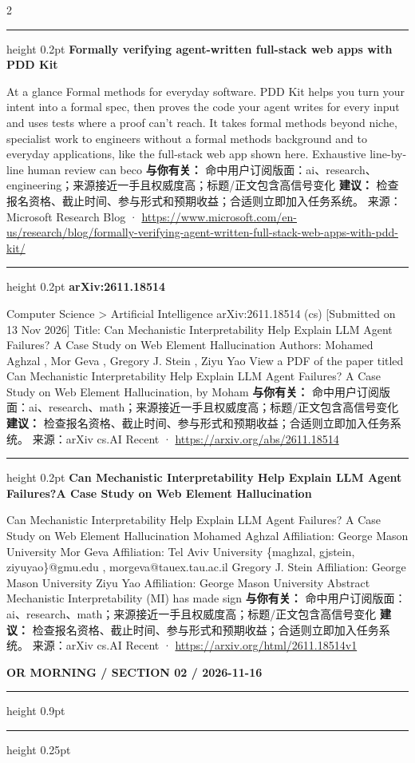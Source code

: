 \documentclass[10.5pt]{ctexart}
\begin{document}
\begin{multicols}{2}
\vspace{2mm}
\hrule height 0.2pt
\vspace{2mm}
{\large\bfseries Formally verifying agent-written full-stack web apps with PDD Kit}\par
At a glance Formal methods for everyday software. PDD Kit helps you turn your intent into a formal spec, then proves the code your agent writes for every input and uses tests where a proof can’t reach. It takes formal methods beyond niche, specialist work to engineers without a formal methods background and to everyday applications, like the full-stack web app shown here. Exhaustive line-by-line human review can beco
\textbf{与你有关：} 命中用户订阅版面：ai、research、engineering；来源接近一手且权威度高；标题/正文包含高信号变化
\textbf{建议：} 检查报名资格、截止时间、参与形式和预期收益；合适则立即加入任务系统。
{\footnotesize\color{ormuted} 来源：Microsoft Research Blog · \url{https://www.microsoft.com/en-us/research/blog/formally-verifying-agent-written-full-stack-web-apps-with-pdd-kit/}}
\vspace{2mm}
\hrule height 0.2pt
\vspace{2mm}
{\large\bfseries arXiv:2611.18514}\par
Computer Science > Artificial Intelligence arXiv:2611.18514 (cs) [Submitted on 13 Nov 2026] Title: Can Mechanistic Interpretability Help Explain LLM Agent Failures? A Case Study on Web Element Hallucination Authors: Mohamed Aghzal , Mor Geva , Gregory J. Stein , Ziyu Yao View a PDF of the paper titled Can Mechanistic Interpretability Help Explain LLM Agent Failures? A Case Study on Web Element Hallucination, by Moham
\textbf{与你有关：} 命中用户订阅版面：ai、research、math；来源接近一手且权威度高；标题/正文包含高信号变化
\textbf{建议：} 检查报名资格、截止时间、参与形式和预期收益；合适则立即加入任务系统。
{\footnotesize\color{ormuted} 来源：arXiv cs.AI Recent · \url{https://arxiv.org/abs/2611.18514}}
\vspace{2mm}
\hrule height 0.2pt
\vspace{2mm}
{\large\bfseries Can Mechanistic Interpretability Help Explain LLM Agent Failures?A Case Study on Web Element Hallucination}\par
Can Mechanistic Interpretability Help Explain LLM Agent Failures? A Case Study on Web Element Hallucination Mohamed Aghzal Affiliation: George Mason University Mor Geva Affiliation: Tel Aviv University \{maghzal, gjstein, ziyuyao\}@gmu.edu , morgeva@tauex.tau.ac.il Gregory J. Stein Affiliation: George Mason University Ziyu Yao Affiliation: George Mason University Abstract Mechanistic Interpretability (MI) has made sign
\textbf{与你有关：} 命中用户订阅版面：ai、research、math；来源接近一手且权威度高；标题/正文包含高信号变化
\textbf{建议：} 检查报名资格、截止时间、参与形式和预期收益；合适则立即加入任务系统。
{\footnotesize\color{ormuted} 来源：arXiv cs.AI Recent · \url{https://arxiv.org/html/2611.18514v1}}
\end{multicols}
\newpage
{\small\bfseries OR MORNING / SECTION 02 / 2026-11-16}
\vspace{2mm}
\hrule height 0.9pt
\vspace{1.5mm}
\hrule height 0.25pt
\vspace{4mm}
\end{document}
